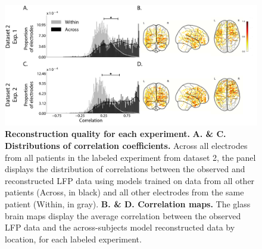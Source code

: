 \documentclass{article}
\begin{document}
\begin{figure}[p!]
\centering
\includegraphics[width=\textwidth]{figs/supplemental_3}
\caption{\small \textbf{Reconstruction quality for each experiment.} \textbf{A. \& C.  Distributions
      of correlation coefficients.}  Across all electrodes from all
    patients in the labeled experiment from dataset 2, the panel displays the distribution of correlations between the observed and reconstructed LFP data using models trained on data from all other patients (Across, in black) and all other electrodes from the same patient (Within, in gray). 
    \textbf{B. \& D. Correlation maps.}  The glass brain maps display the
    average correlation between the observed LFP data and the across-subjects model reconstructed data by location, for each labeled experiment.}
\label{fig:supplemental_3}
\end{figure}


% 
\end{document}
